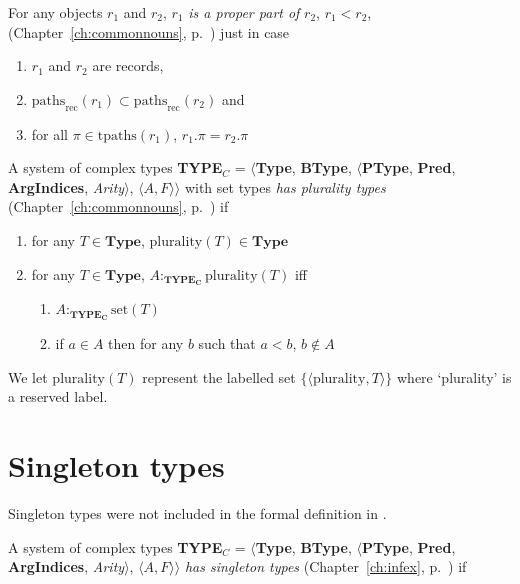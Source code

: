 For any objects $r_1$ and $r_2$, $r_1$ \textit{is a proper
    part of} $r_2$, $r_1<r_2$, (Chapter~\ref{ch:commonnouns},
  p.~\pageref{ex:properpart}) just in case
  \begin{enumerate}
  \item $r_1$ and $r_2$ are records, 
  \item
    $\mathrm{paths}_{\text{rec}}(r_1)\subset\mathrm{paths}_{\text{rec}}(r_2)$
      and
    \item for all $\pi\in\mathrm{tpaths}(r_1)$, $r_1.\pi=r_2.\pi$
    \end{enumerate} 

A system of complex types {\bf TYPE$_C$} = $\langle${\bf Type}, {\bf BType},
$\langle$\textbf{PType}, {\bf Pred}, \textbf{ArgIndices}, {\it
  Arity\/}$\rangle$, $\langle A,F\rangle$$\rangle$ with set types
\textit{has plurality types} (Chapter~\ref{ch:commonnouns},
p.~\pageref{ex:plurality-types}) if
\begin{enumerate} 
 
\item for any $T \in \textbf{Type}$, $\mathrm{plurality}(T) \in \textbf{Type}$ 
 
\item for any $T \in \textbf{Type}$, 
$A:_{\mathbf{TYPE_C}}\mathrm{plurality}(T)$ iff  
\begin{enumerate} 
 
\item $A :_{\mathbf{TYPE_C}} \mathrm{set}(T)$ 
 
\item if $a\in A$ then for any $b$ such that $a<b$, $b\not\in A$ 
 
\end{enumerate} 
  
   
 
\end{enumerate}

We let $\mathrm{plurality}(T)$ represent the labelled set
$\{\langle\text{plurality},T\rangle\}$ where `plurality' is a reserved
label. 

\section{Singleton types}
\label{app:singletontypes}

Singleton types were not included in the formal definition in \cite{Cooper2012}.

A system of complex types {\bf TYPE$_C$} = $\langle${\bf Type}, {\bf BType},
$\langle$\textbf{PType}, {\bf Pred}, \textbf{ArgIndices}, {\it
  Arity\/}$\rangle$, $\langle A,F\rangle$$\rangle$ \textit{has
  singleton types} (Chapter~\ref{ch:infex}, p.~\pageref{ex:singleton-types}) if
 
